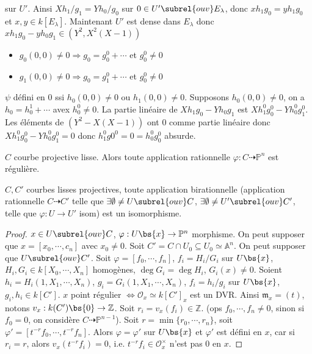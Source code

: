 \begin{expl}
\begin{enumerate}
                    sur $U'$. Ainsi $Xh_1/g_1 = Yh_0/g_0$ sur $0 \in U' \subrel{ouv} E_{\lambda}$, donc $xh_1g_0 = yh_1g_0$ et $x,y \in k[E_\lambda]$. Maintenant $U'$ est dense dans $E_\lambda$ donc $xh_1g_0 - yh_0g_1 \in (Y^2, X^2(X - 1))$
                    \begin{itemize}
                        \item $g_0(0,0) \neq 0 \Rightarrow g_0 = g_0^0 + \cdots$ et $g_0^0 \neq 0$
                        \item $g_1(0,0) \neq 0 \Rightarrow g_0 = g_1^0 + \cdots$ et $g_0^0 \neq 0$
                    \end{itemize}
                    $\psi$ défini en $0$ ssi $h_0(0,0) \neq 0$ ou $h_1(0,0) \neq 0$. Supposons $h_0(0,0) \neq 0$, on a $h_0 = h_0^1 + \cdots$ avex $h_0^0 \neq 0$. La partie linéaire de $Xh_1g_0 - Yh_0g_1$ est $Xh_1^0g_0^0 -  Yh_0^0g_1^0$. Les éléments de $(Y^2 - X(X - 1))$ ont $0$ comme partie linéaire donc $Xh_1^0g_0^0 -  Yh_0^0g_1^0 = 0$ donc $h_1^0g0^0 = 0 = h_0^0 g_0^0$ absurde.
                \end{enumerate}
            \end{expl}
            \begin{coro}
                $C$ courbe projective lisse. Alors toute application rationnelle $\varphi : C \dashrightarrow \mathbb{P}^n$ est régulière.
            \end{coro}
            \begin{coro}
                $C,C'$ courbes lisses projectives, toute application birationnelle (application rationnelle $C \dashrightarrow C'$ telle que $\exists \emptyset \neq U \subrel{ouv} C$, $\exists \emptyset \neq U' \subrel{ouv} C'$, telle que $\varphi : U \to U'$ isom) est un isomorphisme.
            \end{coro}
            \begin{proof}
                $x \in U \subrel{ouv} C$, $\varphi : U \bs \{x\} \to \mathbb{P}^n$ morphisme. On peut supposer que $x = [x_0, \cdots, c_n]$ avec $x_0 \neq 0$. Soit $C' = C \cap U_0 \subseteq U_0 \simeq \mathbb{A}^n$. On peut supposer que $U \subrel{ouv} C'$. Soit $\varphi = [f_0, \cdots, f_n]$, $f_i = H_i/G_i$ sur $U \bs \{x\}$, $H_i, G_i \in k[X_0, \cdots, X_n]$ homogènes, $\deg G_i = \deg H_i$, $G_i(x) \neq 0$. Soient $h_i = H_i(1,X_1, \cdots, X_n)$, $g_i = G_i(1,X_1, \cdots, X_n)$, $f_i = h_i/g_i$ sur $U \bs \{x\}$, $g_i,h_i \in k[C']$. $x$ point régulier $\iff \mathcal{O}_x \simeq k[C']_x$ est un DVR. Ainsi $\mathfrak{m}_x = (t)$, notons $v_x : k(C')  \bs \{0\} \to \mathbb{Z}$. Soit $r_i = v_x(f_i) \in \mathbb{Z}$. (ops $f_0, \cdots, f_n \neq 0$, sinon si $f_0 = 0$, on considère $C \dashrightarrow \mathbb{P}^{n-1}$). Soit $r = \min \{r_0, \cdots, r_n\}$, soit $\varphi' = [t^{-r}f_0, \cdots, t^{-r}f_n]$. Alors $\varphi = \varphi'$ sur $U \bs \{x\}$ et $\varphi'$ est défini en $x$, car si $r_i = r$, alors $v_x(t^{-r}f_i) = 0$, i.e. $t^{-r}f_i \in \mathcal{O}_x^\times$ n'est pas $0$ en $x$.
            \end{proof}
            

